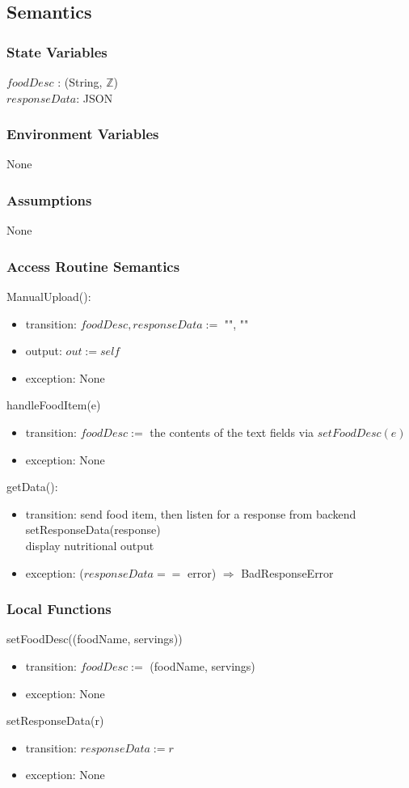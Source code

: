 \documentclass[12pt, titlepage]{article}
\begin{document}
\subsection{Semantics}
\subsubsection{State Variables}
$foodDesc$ : (String, $\mathbb{Z}$)\\
$responseData$: JSON
\subsubsection{Environment Variables}
None
\subsubsection{Assumptions}
None
\subsubsection{Access Routine Semantics}
\noindent ManualUpload():
\begin{itemize}
	\item transition: $foodDesc, responseData := $ "", ""
	\item output: $out := self$ 
	\item exception: None
\end{itemize}
\noindent handleFoodItem(e)
\begin{itemize}
	\item transition: $foodDesc :=$ the contents of the text fields via 
	$setFoodDesc(e)$
	\item exception: None
\end{itemize}
\noindent getData():
\begin{itemize}
	\item transition: send food item, then listen for a response from 
	backend\\ setResponseData(response) \\ display nutritional output
	\item exception: ($responseData ==$ error) $\Rightarrow$ BadResponseError
\end{itemize}
\subsubsection{Local Functions}
\noindent setFoodDesc((foodName, servings))
\begin{itemize}
	\item transition: $ foodDesc := $ (foodName, servings)
	\item exception: None
\end{itemize}
\noindent setResponseData(r)
\begin{itemize}
	\item transition: $ responseData:=r $
	\item exception: None
\end{itemize}
\end{document}
